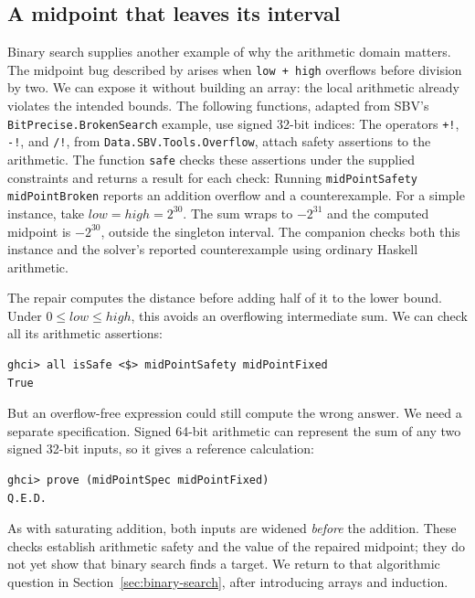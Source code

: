 \documentclass[review]{jfp-epi}
\newcommand{\code}[1]{\texttt{#1}}
\begin{document}
\subsection{A midpoint that leaves its interval}
\label{sec:midpoint}

Binary search supplies another example of why the arithmetic domain matters.
The midpoint bug described by \citet{blochbinarysearch} arises when
\code{low + high} overflows before division by two. We can expose it without
building an array: the local arithmetic already violates the intended bounds.
The following functions, adapted from SBV's \code{BitPrecise.BrokenSearch}
example, use signed 32-bit indices:
The operators \code{+!}, \code{-!}, and \code{/!}, from
\code{Data.SBV.Tools.Overflow}, attach safety assertions to the arithmetic.
The function \code{safe} checks these assertions under the supplied constraints
and returns a result for each check:
Running \code{midPointSafety midPointBroken} reports an addition overflow and a
counterexample. For a simple instance, take $\mathit{low}=\mathit{high}=2^{30}$.
The sum wraps to $-2^{31}$ and the computed midpoint is $-2^{30}$, outside the
singleton interval. The companion checks both this instance and the solver's
reported counterexample using ordinary Haskell arithmetic.

The repair computes the distance before adding half of it to the lower bound.
Under $0\leq\mathit{low}\leq\mathit{high}$, this avoids an overflowing
intermediate sum. We can check all its arithmetic assertions:
\begin{lstlisting}[style=output]
ghci> all isSafe <$> midPointSafety midPointFixed
True
\end{lstlisting}
But an overflow-free expression could still compute the wrong answer. We need
a separate specification. Signed 64-bit arithmetic can represent the sum of any
two signed 32-bit inputs, so it gives a reference calculation:
\begin{lstlisting}[style=output]
ghci> prove (midPointSpec midPointFixed)
Q.E.D.
\end{lstlisting}
As with saturating addition, both inputs are widened \emph{before} the addition.
These checks establish arithmetic safety and the value of the repaired midpoint;
they do not yet show that binary search finds a target. We return to that
algorithmic question in Section~\ref{sec:binary-search}, after introducing arrays
and induction.

\end{document}
